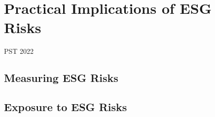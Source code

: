\chapter{Practical Implications of ESG Risks}

PST 2022

\section{Measuring ESG Risks}

\section{Exposure to ESG Risks}
